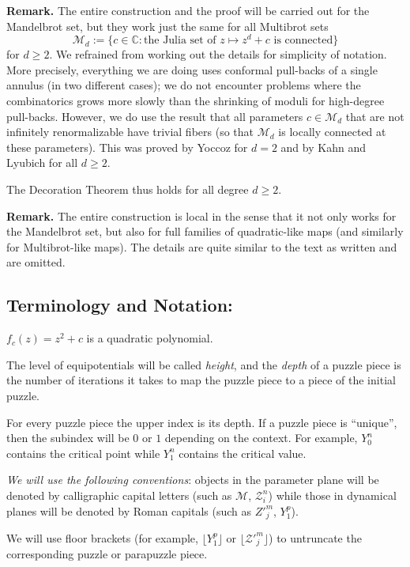 \documentclass[12pt,a4paper]{amsart}
\newcommand{\C}{\mathbb{C}}
\newcommand{\MM}{\mathcal M}
\newcommand{\ZZ}{\mathcal Z}
\begin{document}
\noindent\textbf{Remark.} The entire construction and the proof will
be carried out for the Mandelbrot set, but they work just the same
for all Multibrot sets
\[
\MM_d:=\{c\in\C\colon \text{the Julia set of $z\mapsto z^d+c$ is connected}\}
\]
for $d\ge 2$. We refrained from working out the details for simplicity of notation.
More precisely, everything we are doing uses conformal pull-backs of a single annulus (in two different cases);
 we do not encounter problems where the combinatorics grows more slowly than
 the shrinking of moduli for high-degree pull-backs. However, we do use the result
 that all parameters $c\in\MM_d$ that are not infinitely renormalizable have trivial
 fibers (so that $\MM_d$ is locally connected at these parameters). This was proved by Yoccoz for
 $d=2$ and by Kahn and Lyubich for all $d\ge 2$.

The Decoration Theorem thus holds for all degree $d\ge2$.

\medskip

\noindent\textbf{Remark.} The entire construction is local in the
sense that it not only works for the Mandelbrot set, but also for
full families of quadratic-like maps (and similarly for
Multibrot-like maps). The details are quite similar to the text as
written and are omitted.

\subsection{Terminology and Notation:}

$f_{c}(z)=z^{2}+c$ is a quadratic polynomial.

The level of equipotentials will be called \textit{height}, and the
\textit{depth} of a puzzle piece is the number of iterations it
takes to map the puzzle piece to a piece of the initial puzzle.

For every puzzle piece the upper index is its depth. If a puzzle
piece is ``unique'', then the subindex will be $0$ or $1$ depending
on the context. For example, $Y^n_0$ contains the critical point
while $Y^n_1$ contains the critical value.


  \textit{We will use the following conventions}: objects in the parameter
plane will be denoted by calligraphic capital letters (such as
$\MM$, $\ZZ^n_i$) while those in dynamical planes will be denoted by
Roman capitals (such as $Z'^m_j$, $Y^p_1$).


  We will use floor brackets (for example,
$\lfloor Y^p_1\rfloor$ or $\lfloor\ZZ'^m_j\rfloor$) to untruncate
the corresponding puzzle or parapuzzle piece.
\end{document}
